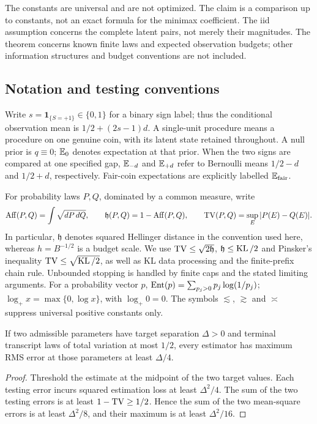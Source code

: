 The constants are universal and are not optimized. The claim is a
comparison up to constants, not an exact formula for the minimax
coefficient. The iid assumption concerns the complete latent pairs,
not merely their magnitudes. The theorem concerns known finite laws
and expected observation budgets; other information structures and
budget conventions are not included.

\subsection{Notation and testing conventions}\label{sec:notation}
Write $s=\mathbf1_{\{S=+1\}}\in\{0,1\}$ for a binary sign label;
thus the conditional observation mean is $1/2+(2s-1)d$. A
single-unit procedure means a procedure on one genuine coin, with
its latent state retained throughout. A null prior is $q\equiv0$;
$\mathbb E_0$ denotes expectation at that prior. When the two signs are
compared at one specified gap, $\mathbb E_{-d}$ and $\mathbb E_{+d}$ refer to
Bernoulli means $1/2-d$ and $1/2+d$, respectively. Fair-coin
expectations are explicitly labelled $\mathbb E_{\rm fair}$.

For probability laws $P,Q$, dominated by a common measure, write
\[
 \operatorname{Aff}(P,Q)=\int\sqrt{dP\,dQ},\qquad
 \mathfrak h(P,Q)=1-\operatorname{Aff}(P,Q),\qquad
 \operatorname{TV}(P,Q)=\sup_E|P(E)-Q(E)|.
\]
In particular, $\mathfrak h$ denotes squared Hellinger distance in
the convention used here, whereas $h=B^{-1/2}$ is a budget scale.
We use $\operatorname{TV}\le\sqrt{2\mathfrak h}$, $\mathfrak h\le\operatorname{KL}/2$ and
Pinsker's inequality $\operatorname{TV}\le\sqrt{\operatorname{KL}/2}$, as well as KL data
processing and the finite-prefix chain rule. Unbounded stopping
is handled by finite caps and the stated limiting arguments.
For a probability vector $p$, $\operatorname{Ent}(p)=\sum_{p_j>0}p_j\log(1/p_j)$;
$\log_+x=\max\{0,\log x\}$, with $\log_+0=0$. The symbols
$\lesssim$, $\gtrsim$ and $\asymp$ suppress universal positive
constants only.

\begin{lemma}\label{lem:two-point}
If two admissible parameters have target separation $\Delta>0$
and terminal transcript laws of total variation at most $1/2$,
every estimator has maximum RMS error at those parameters at
least $\Delta/4$.
\end{lemma}
\begin{proof}
Threshold the estimate at the midpoint of the two target values.
Each testing error incurs squared estimation loss at least
$\Delta^2/4$. The sum of the two testing errors is at least
$1-\operatorname{TV}\ge1/2$. Hence the sum of the two mean-square errors is
at least $\Delta^2/8$, and their maximum is at least $\Delta^2/16$.
\end{proof}
